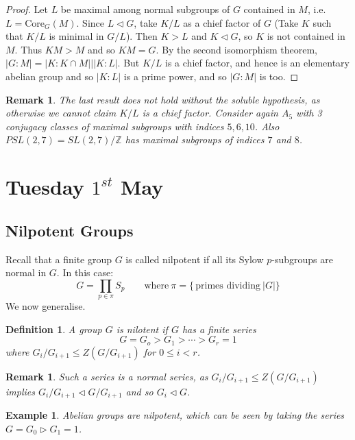 \documentclass[a4paper,10pt]{article}
\newcommand{\ZZ}{\mathbb{Z}}
\newtheorem{Def}[thm]{Definition}
\newtheorem{eg}[thm]{Example}
\newtheorem{rem}[thm]{Remark}
\begin{document}
\begin{proof}
Let $L$ be maximal among normal subgroups of $G$ contained in $M$, i.e. $L = \text{Core}_G(M)$. Since $L \triangleleft G$, take $K / L$ as a chief factor of $G$ (Take $K$ such that $K / L$ is minimal in $G / L$). Then $K > L$ and $K \triangleleft G$, so $K$ is not contained in $M$. Thus $KM > M$ and so $KM = G$. By the second isomorphism theorem, $|G : M| = |K : K \cap M| \big| |K : L|$. But $K  / L$ is a chief factor, and hence is an elementary abelian group and so $|K : L |$ is a prime power, and so $|G:M|$ is too.
\end{proof}

\begin{rem}
The last result does not hold without the soluble hypothesis, as otherwise we cannot claim $K / L$ is a chief factor. Consider again $A_5$ with 3 conjugacy classes of maximal subgroups with indices $5,6,10$. Also $PSL(2,7) = SL(2,7) / \ZZ$ has maximal subgroups of indices $7$ and $8$.
\end{rem}


\newpage
\section{Tuesday $1^{st}$ May}
\subsection*{Nilpotent Groups}

Recall that a finite group $G$ is called nilpotent if all its Sylow $p$-subgroups are normal in $G$. In this case:
\[ G = \prod_{p \in \pi} S_p \qquad \text{where} \ \pi = \{ \, \text{primes dividing} \ |G| \} \]
We now generalise.
\begin{Def}
A group $G$ is nilotent if $G$ has a finite series
\[ G = G_o > G_1 > \cdots > G_r = 1 \]
where $G_i / G_{i+1} \leq Z(G / G_{i+1})$ for $0 \leq i < r$.
\end{Def}

\begin{rem}
Such a series is a normal series, as $G_i / G_{i+1} \leq Z(G / G_{i+1})$ implies $G_i / G_{i+1} \triangleleft G / G_{i+1}$ and so $G_i \triangleleft G$. 
\end{rem}

\begin{eg}
Abelian groups are nilpotent, which can be seen by taking the series $G = G_0 \triangleright G_1 = 1$. 
\end{eg}
\end{document}
